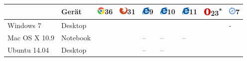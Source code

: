 \begin{table}[tbp]
	\centering
	\small
	\begin{tabularx}{\textwidth}{llYYYYYYY}
		\toprule
						& Gerät
						& \footnotesize \includegraphics[height=1em]{kap5/figures/chrome.eps}\hspace{1ex}\textsf{36}
						& \footnotesize \includegraphics[height=1em]{kap5/figures/firefox.eps}\hspace{1ex}\textsf{31}
						& \footnotesize \includegraphics[height=1em]{kap5/figures/ie.eps}\hspace{1ex}\textsf{9}
						& \footnotesize \includegraphics[height=1em]{kap5/figures/ie.eps}\hspace{1ex}\textsf{10}
						& \footnotesize \includegraphics[height=1em]{kap5/figures/ie.eps}\hspace{1ex}\textsf{11}
						& \footnotesize \includegraphics[height=1em]{kap5/figures/opera.eps}\hspace{1ex}\textsf{23}\textsuperscript{*}
						& \footnotesize \includegraphics[height=1em]{kap5/figures/safari.eps}\hspace{1ex}\textsf{7} \\
		\midrule
		\small
		Windows 7		& Desktop
						&  
						&  
						&  
						&  
						&  
						&  
						& - 					\\
		Mac OS X 10.9	& Notebook %
						&  
						&  
						& --
						& --
						& --
						&  
						&  	 	\\
		Ubuntu 14.04	& Desktop
						&  
						&  
						& --
						& --

\end{tabularx}
\end{table}
